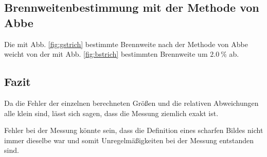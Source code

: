 \subsection{Brennweitenbestimmung mit der Methode von Abbe}
Die mit Abb. \ref{fig:gstrich} bestimmte Brennweite nach der Methode von Abbe weicht von der mit Abb. \ref{fig:bstrich} bestimmten Brennweite um $\SI{2.0}{\percent}$ ab.

\subsection{Fazit}
Da die Fehler der einzelnen berechneten Größen und die relativen Abweichungen alle klein sind, lässt sich sagen, dass die Messung ziemlich exakt ist.

\noindent Fehler bei der Messung könnte sein, dass die Definition eines scharfen Bildes nicht immer dieselbe war und somit Unregelmäßigkeiten bei der Messung entstanden sind.